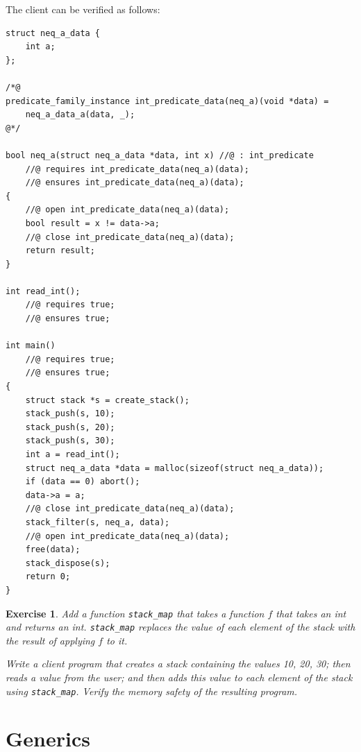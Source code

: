 \documentclass{article}
\newtheorem{exercise}{Exercise}
\begin{document}
The client can be verified as follows:
\begin{lstlisting}
struct neq_a_data {
    int a;
};

/*@
predicate_family_instance int_predicate_data(neq_a)(void *data) =
    neq_a_data_a(data, _);
@*/

bool neq_a(struct neq_a_data *data, int x) //@ : int_predicate
    //@ requires int_predicate_data(neq_a)(data);
    //@ ensures int_predicate_data(neq_a)(data);
{
    //@ open int_predicate_data(neq_a)(data);
    bool result = x != data->a;
    //@ close int_predicate_data(neq_a)(data);
    return result;
}

int read_int();
    //@ requires true;
    //@ ensures true;

int main()
    //@ requires true;
    //@ ensures true;
{
    struct stack *s = create_stack();
    stack_push(s, 10);
    stack_push(s, 20);
    stack_push(s, 30);
    int a = read_int();
    struct neq_a_data *data = malloc(sizeof(struct neq_a_data));
    if (data == 0) abort();
    data->a = a;
    //@ close int_predicate_data(neq_a)(data);
    stack_filter(s, neq_a, data);
    //@ open int_predicate_data(neq_a)(data);
    free(data);
    stack_dispose(s);
    return 0;
}
\end{lstlisting}

\begin{exercise}\label{exercise:map}
Add a function \lstinline!stack_map! that takes a function $f$
that takes an int and returns an int. \lstinline!stack_map!
replaces the value of each element of the stack with the result
of applying $f$ to it.

Write a client program that creates a stack containing the
values 10, 20, 30; then reads a value from the user; and then
adds this value to each element of the stack using
\lstinline!stack_map!. Verify the memory safety of the
resulting program.
\end{exercise}

\section{Generics}\label{section:generics}
\end{document}
